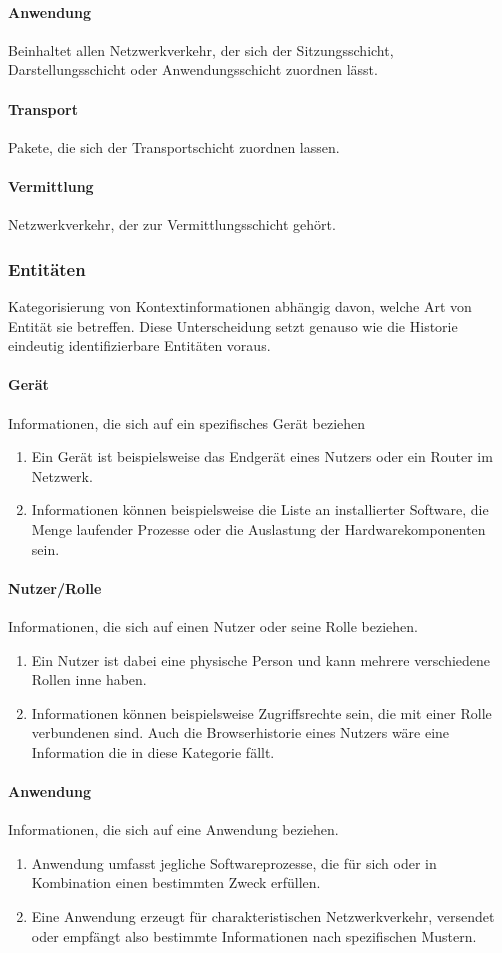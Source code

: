 \paragraph{Anwendung}
Beinhaltet allen Netzwerkverkehr, der sich der Sitzungsschicht, Darstellungsschicht oder Anwendungsschicht zuordnen lässt. 
\paragraph{Transport}
Pakete, die sich der Transportschicht zuordnen lassen.
\paragraph{Vermittlung}
Netzwerkverkehr, der zur Vermittlungsschicht gehört.
\subsubsection{Entitäten}
Kategorisierung von Kontextinformationen abhängig davon, welche Art von Entität sie betreffen.
Diese Unterscheidung setzt genauso wie die Historie eindeutig identifizierbare Entitäten voraus.
\paragraph{Gerät}
Informationen, die sich auf ein spezifisches Gerät beziehen
\begin{enumerate}
\item{Ein Gerät ist beispielsweise das Endgerät eines Nutzers oder ein Router im Netzwerk. }
\item{Informationen können beispielsweise die Liste an installierter Software, die Menge laufender Prozesse oder die Auslastung der Hardwarekomponenten sein.}
\end{enumerate}
\paragraph{Nutzer/Rolle}
Informationen, die sich auf einen Nutzer oder seine Rolle beziehen.
\begin{enumerate}
\item{Ein Nutzer ist dabei eine physische Person und kann mehrere verschiedene Rollen inne haben. }
\item{Informationen können beispielsweise Zugriffsrechte sein, die mit einer Rolle verbundenen sind. Auch die Browserhistorie eines Nutzers wäre eine Information die in diese Kategorie fällt.}
\end{enumerate}
\paragraph{Anwendung}
Informationen, die sich auf eine Anwendung beziehen.
\begin{enumerate}
\item{Anwendung umfasst jegliche Softwareprozesse, die für sich oder in Kombination einen bestimmten Zweck erfüllen.}
\item{Eine Anwendung erzeugt für charakteristischen Netzwerkverkehr, versendet oder empfängt also bestimmte Informationen nach spezifischen Mustern.}
\end{enumerate}
